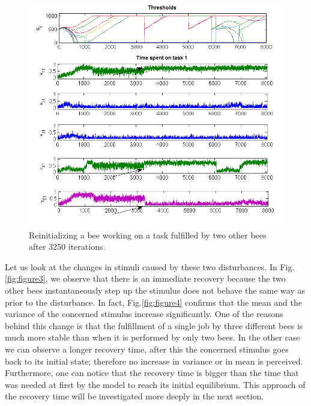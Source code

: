 \begin{center}
\begin{figure}[ht!]
\centering{}\includegraphics[scale=0.6]{figures/Figure2}\caption{Reinitializing a bee working on a task fulfilled by two other bees after 3250 iterations.}
\label{fig:figure2}
\end{figure}

\par\end{center}

Let us look at the changes in stimuli caused by these two disturbances. In Fig.\ref{fig:figure3}, we observe that there is an immediate recovery because the two other bees instantaneously step up the stimulus does not behave the same way as prior to the disturbance.
In fact, Fig.\ref{fig:figure4} confirms that the mean and the variance of the concerned stimulus increase significantly. One of the reasons behind this change is that the fulfillment of a single job by three different bees is much more stable than when it is performed by only two bees. In the other case we can observe a longer recovery time, after this the concerned stimulus goes back to its initial state; therefore no increase in variance or in mean is perceived. Furthermore, one can notice that the recovery time is bigger than the time that was needed at first by the model to reach its initial equilibrium. This approach of the recovery time will be investigated more deeply in the next section.

